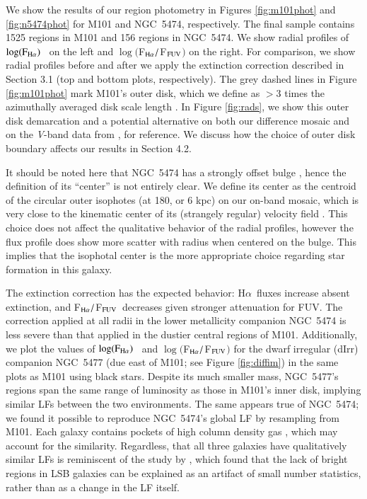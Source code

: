 \documentclass[iop]{emulateapj}
\newcommand{\ha}{H$\alpha$}
\newcommand{\hafuv}{F$_{\rm H\alpha}/$F$_{\rm FUV}$}
\newcommand{\lgflux}{$\log(\rm F_{\rm H\alpha})$}
\begin{document}
We show the results of our  region photometry in Figures
\ref{fig:m101phot} and \ref{fig:n5474phot} for M101 and NGC~5474,
respectively.  The final sample contains 1525  regions in
M101 and 156 regions in NGC~5474.  We show radial profiles of \lgflux
\ on the left and $\log($\hafuv$)$ on the right.  For comparison, we
show radial profiles before and after we apply the extinction
correction described in Section 3.1 (top and bottom plots,
respectively).  The grey dashed lines in Figure \ref{fig:m101phot}
mark M101's outer disk, which we define as $>$3 times the azimuthally
averaged disk scale length \citep[430\arcsec, 14.5 kpc;][]{mihos13}.
In Figure \ref{fig:rads}, we show this outer disk demarcation and a
potential alternative on both our difference mosaic and on the
\emph{V}-band data from \citet{mihos13}, for reference.  We discuss
how the choice of outer disk boundary affects our results in Section
4.2.

It should be noted here that NGC~5474 has a strongly offset bulge
\citep{vanderhulst79, kornreich98}, hence the definition of its
``center'' is not entirely clear.  We define its center as the centroid
of the circular outer isophotes (at 180\arcsec, or 6 kpc) on our
on-band mosaic, which is very close to the kinematic center of its
(strangely regular)  velocity field \citep{vanderhulst79}.
This choice does not affect the qualitative behavior of the radial
profiles, however the flux profile does show more scatter with radius
when centered on the bulge.  This implies that the isophotal center is
the more appropriate choice regarding star formation in this galaxy.

The extinction correction has the expected behavior: \ha \ fluxes
increase absent extinction, and \hafuv \ decreases given stronger
attenuation for FUV.  The correction applied at all radii in the lower
metallicity companion NGC~5474 \citep[which has a central O
  abundance of $12 + \log({\rm O}/{\rm H})=8.19$, vs. 8.71 in
  M101;][]{pilyugin14} is less severe than that applied in the dustier
central regions of M101.  Additionally, we plot the values of \lgflux
\ and $\log($\hafuv$)$ for the dwarf irregular (dIrr) companion
NGC~5477 (due east of M101; see Figure \ref{fig:diffim}) in the same
plots as M101 using black stars.  Despite its much smaller mass,
NGC~5477's  regions span the same range of luminosity as
those in M101's inner disk, implying similar LFs between the two
environments.  The same appears true of NGC~5474; we found it possible
to reproduce NGC~5474's global LF by resampling from M101.  Each
galaxy contains pockets of high column density gas \citep[of order
  $10^{21}$ cm$^{-2}$;][]{vanderhulst79, vanderhulst01, walter08},
which may account for the similarity.  Regardless, that all three
galaxies have qualitatively similar LFs is reminiscent of the study by
\citet{schombert13}, which found that the lack of bright 
regions in LSB galaxies can be explained as an artifact of small
number statistics, rather than as a change in the LF itself.
\end{document}
